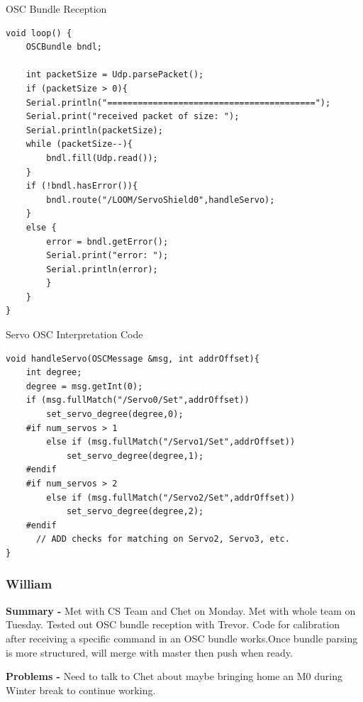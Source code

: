 \documentclass[onecolumn, draftclsnofoot,10pt, compsoc]{IEEEtran}
\begin{document}
    \begin{listing}[H]    
        \caption{OSC Bundle Reception} 
        \label{lst:osc_bundle_reception} 
        \begin{verbatim}
void loop() {
    OSCBundle bndl;

    int packetSize = Udp.parsePacket();
    if (packetSize > 0){
    Serial.println("=========================================");
    Serial.print("received packet of size: ");
    Serial.println(packetSize);
    while (packetSize--){
        bndl.fill(Udp.read());
    }
    if (!bndl.hasError()){
        bndl.route("/LOOM/ServoShield0",handleServo);
    }
    else {
        error = bndl.getError();
        Serial.print("error: ");
        Serial.println(error);
        }
    } 
}
        \end{verbatim}
    \end{listing}


    \begin{listing}[H]    
        \caption{Servo OSC Interpretation Code} 
        \label{lst:servo_interpret_osc}   
        \begin{verbatim}
void handleServo(OSCMessage &msg, int addrOffset){
    int degree;
    degree = msg.getInt(0);
    if (msg.fullMatch("/Servo0/Set",addrOffset))
        set_servo_degree(degree,0);
    #if num_servos > 1
        else if (msg.fullMatch("/Servo1/Set",addrOffset))
            set_servo_degree(degree,1);
    #endif
    #if num_servos > 2
        else if (msg.fullMatch("/Servo2/Set",addrOffset))
            set_servo_degree(degree,2);
    #endif
      // ADD checks for matching on Servo2, Servo3, etc.
}
        \end{verbatim} 
    \end{listing}

\subsubsection*{William}
    \begin{adjustwidth}{2.5em}{0pt}
    \textbf{Summary -} Met with CS Team and Chet on Monday. Met with whole team on Tuesday. Tested out OSC bundle reception with Trevor. Code for calibration after receiving a specific command in an OSC bundle works.Once bundle parsing is more structured, will merge with master then push when ready.
    
    \textbf{Problems -} Need to talk to Chet about maybe bringing home an M0 during Winter break to continue working. 
    \end{adjustwidth}
\end{document}
